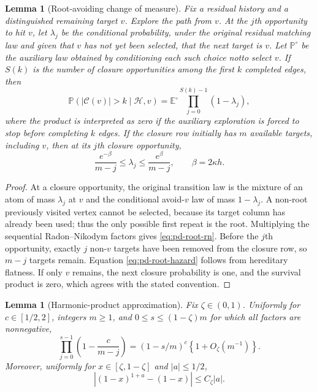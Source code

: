 \documentclass[11pt]{article}
\newtheorem{lemma}[theorem]{Lemma}
\theoremstyle{remark}
\newcommand{\Pp}{\mathbb P}
\newcommand{\Ee}{\mathbb E}
\begin{document}
\begin{lemma}[Root-avoiding change of measure]
\label{lem:pd-root-avoiding}
Fix a residual history and a distinguished remaining target $v$.  Explore the
path from $v$.  At the $j$th opportunity to hit $v$, let $\lambda_j$ be the
conditional probability, under the original residual matching law and given
that $v$ has not yet been selected, that the next target is $v$.  Let
$\Pp^\circ$ be the auxiliary law obtained by conditioning each such choice notto select $v$.  If $S(k)$ is the number of closure opportunities among the
first $k$ completed edges, then
\begin{equation}
        \Pp(|\mathcal C(v)|>k\mid\mathcal H,v)
        =\Ee^\circ\prod_{j=0}^{S(k)-1}(1-\lambda_j),
 \label{eq:pd-root-rn}
\end{equation}
where the product is interpreted as zero if the auxiliary exploration is
forced to stop before completing $k$ edges.  If the closure row initially has
$m$ available targets, including $v$, then at its $j$th closure opportunity,
\begin{equation}
        \frac{e^{-\beta}}{m-j}\le\lambda_j\le
        \frac{e^\beta}{m-j},
        \qquad \beta=2\kappa h.
 \label{eq:pd-root-hazard}
\end{equation}
\end{lemma}

\begin{proof}
At a closure opportunity, the original transition law is the mixture of an
atom of mass $\lambda_j$ at $v$ and the conditional avoid-$v$ law of mass
$1-\lambda_j$.  A non-root previously visited vertex cannot be selected,
because its target column has already been used; thus the only possible first
repeat is the root.  Multiplying the sequential Radon--Nikodym factors gives
\eqref{eq:pd-root-rn}.  Before the $j$th opportunity, exactly $j$ non-$v$
targets have been removed from the closure row, so $m-j$ targets remain.
Equation \eqref{eq:pd-root-hazard} follows from hereditary flatness.  If only
$v$ remains, the next closure probability is one, and the survival product is
zero, which agrees with the stated convention.
\end{proof}

\begin{lemma}[Harmonic-product approximation]
\label{lem:pd-harmonic-product}
Fix $\zeta\in(0,1)$.  Uniformly for $c\in[1/2,2]$, integers $m\ge1$, and
$0\le s\le(1-\zeta)m$ for which all factors are nonnegative,
\[
 \prod_{j=0}^{s-1}\left(1-\frac c{m-j}\right)
 =(1-s/m)^c\left\{1+O_\zeta(m^{-1})\right\}.
\]
Moreover, uniformly for $x\in[\zeta,1-\zeta]$ and $|a|\le1/2$,
\[
        |(1-x)^{1+a}-(1-x)|\le C_\zeta|a|.
\]
\end{lemma}
\end{document}
